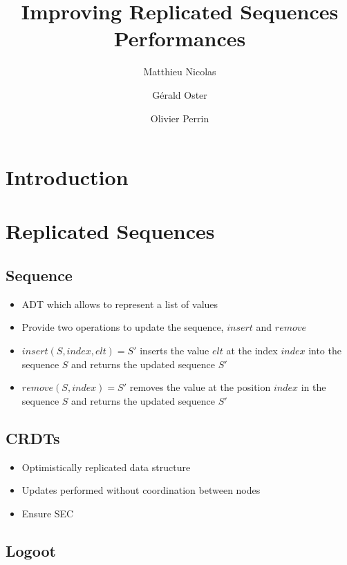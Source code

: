 \documentclass{article}
\begin{document}
\title{Improving Replicated Sequences Performances}
\author{Matthieu Nicolas}
\author{Gérald Oster}
\author{Olivier Perrin}
\date{}

\maketitle

\section{Introduction}

\section{Replicated Sequences}

\subsection{Sequence}

\begin{itemize}
    \item \ac{ADT} which allows to represent a list of values
    \item Provide two operations to update the sequence, $insert$ and $remove$
    \item $insert(S, index, elt) = S'$ inserts the value $elt$ at the index $index$ into the sequence $S$ and returns the updated sequence $S'$
    \item $remove(S, index) = S'$ removes the value at the position $index$ in the sequence $S$ and returns the updated sequence $S'$
\end{itemize}

\subsection{\acp{CRDT} \cite{shapiro:inria-00555588, shapiro_2011_crdt}}

\begin{itemize}
    \item Optimistically replicated data structure
    \item Updates performed without coordination between nodes
    \item Ensure \ac{SEC} \cite{shapiro_2011_crdt}
\end{itemize}

\subsection{Logoot \cite{WeissICDCS09}}
\end{document}
